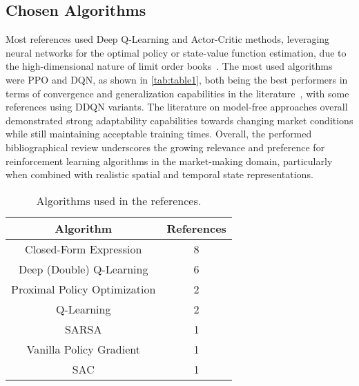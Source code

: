 \subsection{Chosen Algorithms}
\label{subsec:chosen-algorithms}
Most references used Deep Q-Learning and Actor-Critic methods, leveraging neural networks for the optimal policy or state-value function estimation,
due to the high-dimensional nature of limit order books~\cite{Patel2018, Ganesh2019}.
The most used algorithms were PPO and DQN, as shown in \autoref{tab:table1},
both being the best performers in terms of convergence and generalization capabilities in the literature~\cite{Sun2022, Gasperov2021a}, with some references using DDQN variants.
The literature on model-free approaches overall demonstrated strong adaptability capabilities towards changing market conditions
while still maintaining acceptable training times.
Overall, the performed bibliographical review underscores the growing relevance and preference for reinforcement learning algorithms in the market-making domain,
particularly when combined with realistic spatial and temporal state representations.

\begin{table}
    \centering
    \begin{tabular}{|c|c|}
        \hline
        \textbf{Algorithm}           & \textbf{References} \\
        \hline
        Closed-Form Expression       & 8                   \\
        Deep (Double) Q-Learning     & 6                   \\
        Proximal Policy Optimization & 2                   \\
        Q-Learning                   & 2                   \\
        SARSA                        & 1                   \\
        Vanilla Policy Gradient      & 1                   \\
        SAC                          & 1                   \\
        \hline
    \end{tabular}
    \caption{Algorithms used in the references.}
    \label{tab:table1}
\end{table}
